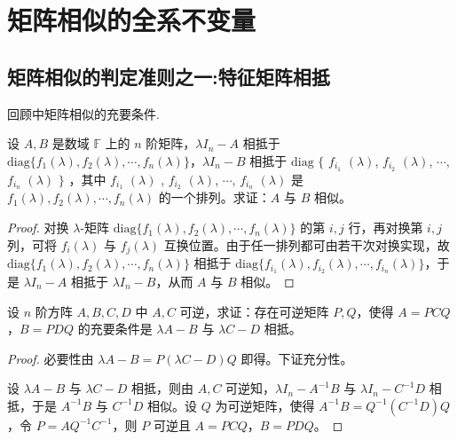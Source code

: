 \documentclass[../../main.tex]{subfiles}
\begin{document}
\section{矩阵相似的全系不变量}

\subsection{矩阵相似的判定准则之一:特征矩阵相抵}

回顾中矩阵相似的充要条件.

\begin{proposition}\label{proposition:对角元素任意排列仍相似}
设 $A,B$ 是数域 $\mathbb{F}$ 上的 $n$ 阶矩阵，$\lambda I_n - A$ 相抵于 $\mathrm{diag}\{f_1(\lambda), f_2(\lambda), \cdots, f_n(\lambda)\}$，$\lambda I_n - B$ 相抵于 $\mathrm{diag}$ $\{ $ $f_{i_1}$ $(\lambda)$, $f_{i_2}$ $(\lambda)$, $\cdots$, $f_{i_n}$ $(\lambda)$ $\}$ ，其中 $f_{i_1}$ $(\lambda)$ , $f_{i_2}$ $(\lambda)$, $\cdots$, $f_{i_n}$ $(\lambda)$ 是 $f_1(\lambda), f_2(\lambda), \cdots, f_n(\lambda)$ 的一个排列。求证：$A$ 与 $B$ 相似。
\end{proposition}
\begin{proof}
对换 $\lambda$-矩阵 $\mathrm{diag}\{f_1(\lambda), f_2(\lambda), \cdots, f_n(\lambda)\}$ 的第 $i,j$ 行，再对换第 $i,j$ 列，可将 $f_i(\lambda)$ 与 $f_j(\lambda)$ 互换位置。由于任一排列都可由若干次对换实现，故 $\mathrm{diag}\{f_1(\lambda), f_2(\lambda), \cdots, f_n(\lambda)\}$ 相抵于 $\mathrm{diag}\{f_{i_1}(\lambda), f_{i_2}(\lambda), \cdots, f_{i_n}(\lambda)\}$，于是 $\lambda I_n - A$ 相抵于 $\lambda I_n - B$，从而 $A$ 与 $B$ 相似。
\end{proof}

\begin{example}
设 $n$ 阶方阵 $A,B,C,D$ 中 $A,C$ 可逆，求证：存在可逆矩阵 $P,Q$，使得 $A = PCQ$，$B = PDQ$ 的充要条件是 $\lambda A - B$ 与 $\lambda C - D$ 相抵。
\end{example}
\begin{proof}
必要性由 $\lambda A - B = P(\lambda C - D)Q$ 即得。下证充分性。

设 $\lambda A - B$ 与 $\lambda C - D$ 相抵，则由 $A,C$ 可逆知，$\lambda I_n - A^{-1}B$ 与 $\lambda I_n - C^{-1}D$ 相抵，于是 $A^{-1}B$ 与 $C^{-1}D$ 相似。设 $Q$ 为可逆矩阵，使得 $A^{-1}B = Q^{-1}(C^{-1}D)Q$，令 $P = AQ^{-1}C^{-1}$，则 $P$ 可逆且 $A = PCQ$，$B = PDQ$。
\end{proof}
\end{document}
